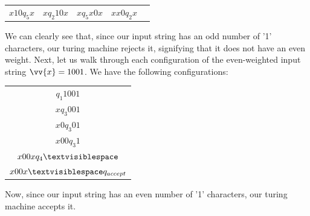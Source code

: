 \documentclass{article}
\begin{document}
\begin{exmp}
\begin{center}
\begin{tabular}{ c c c c c }
	$x10q_{5}x$ & $xq_{2}10x$ & $xq_{5}x0x$ & $xx0q_{2}x$
\end{tabular}
\end{center}
\noindent We can clearly see that, since our input string has an odd number of '1' characters, our turing machine rejects it, signifying that it does not have an even weight.  Next, let us walk through each configuration of the even-weighted input string $\vv{x} = 1001$.  We have the following configurations:
\begin{center}
\begin{tabular}{ c }
	$q_{1}1001$ \\
	$xq_{3}001$ \\
	$x0q_{3}01$ \\
	$x00q_{3}1$ \\
	$x00xq_{4}\textvisiblespace$ \\
	$x00x\textvisiblespace q_{accept}$
\end{tabular}
\end{center}
\end{exmp}
\noindent Now, since our input string has an even number of '1' characters, our turing machine accepts it. \cite{2}
\end{document}

